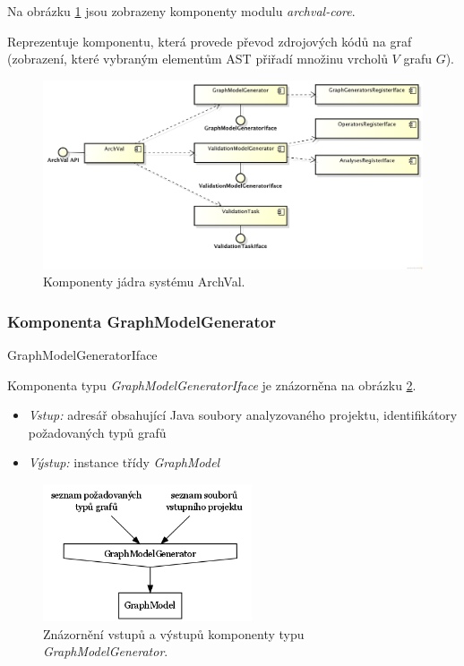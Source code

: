 Na obrázku \ref{design-archval_core} jsou zobrazeny komponenty modulu \emph{archval-core}.

Reprezentuje komponentu, která provede převod zdrojových kódů na graf (zobrazení, které vybraným elementům AST přiřadí množinu vrcholů $V$ grafu $G$).

\begin{figure}[h!]
  \centering
  \includegraphics[width=1.0\textwidth]{./uml/archval_core_cmp.png}
  \caption{Komponenty jádra systému ArchVal.\label{design-archval_core}}
\end{figure}

\subsubsection{Komponenta GraphModelGenerator}
GraphModelGeneratorIface

Komponenta typu \emph{GraphModelGeneratorIface} je znázorněna na obrázku \ref{design-graph_generator_io}.

\begin{itemize}
\item \emph{Vstup:} adresář obsahující Java soubory analyzovaného projektu, identifikátory požadovaných typů grafů
\item \emph{Výstup:} instance třídy \emph{GraphModel}
\end{itemize}

\begin{figure}[h!]
  \centering
  \includegraphics[width=0.55\textwidth]{./graphs/graph_generator_io_graph.png}
  \caption{Znázornění vstupů a výstupů komponenty typu \emph{GraphModelGenerator}.\label{design-graph_generator_io}}
\end{figure}

